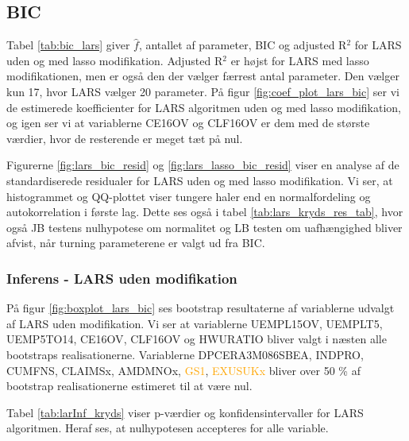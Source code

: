 \subsection{BIC}
Tabel \ref{tab:bic_lars} giver $\widehat{f}$, antallet af parameter, BIC og adjusted R$^2$ for LARS uden og med lasso modifikation. 
Adjusted R$^2$ er højst for LARS med lasso modifikationen, men er også den der vælger færrest antal parameter. 
Den vælger kun 17, hvor LARS vælger 20 parameter. 
På figur \ref{fig:coef_plot_lars_bic} ser vi de estimerede koefficienter for LARS algoritmen uden og med lasso modifikation, og igen ser  vi at variablerne \textcolor{blue3}{CE16OV} og \textcolor{blue3}{CLF16OV} er dem med de største værdier, hvor de resterende er meget tæt på nul. 




Figurerne \ref{fig:lars_bic_resid} og  \ref{fig:lars_lasso_bic_resid} viser en analyse af de standardiserede residualer for LARS uden og med lasso modifikation. Vi ser, at histogrammet og QQ-plottet viser tungere haler end en normalfordeling og autokorrelation i første lag. Dette ses også i tabel \ref{tab:lars_kryds_res_tab}, hvor også JB testens nulhypotese om normalitet og LB testen om uafhængighed bliver afvist, når turning parameterene er valgt ud fra BIC. 


\subsubsection{Inferens - LARS uden modifikation}
På figur \ref{fig:boxplot_lars_bic} ses bootstrap resultaterne af variablerne udvalgt af LARS uden modifikation. Vi ser at variablerne  \textcolor{blue3}{UEMPL15OV}, \textcolor{blue3}{UEMPLT5}, \textcolor{blue3}{UEMP5TO14}, \textcolor{blue3}{CE16OV}, \textcolor{blue3}{CLF16OV} og \textcolor{blue3}{HWURATIO} bliver valgt i næsten alle bootstraps realisationerne.
 Variablerne \textcolor{red3}{DPCERA3M086SBEA},  \textcolor{chartreuse4}{INDPRO}, \textcolor{chartreuse4}{CUMFNS}, \textcolor{blue3}{CLAIMSx}, \textcolor{red3}{AMDMNOx}, \textcolor{orange}{GS1}, \textcolor{orange}{EXUSUKx}  bliver over 50 \% af bootstrap realisationerne estimeret til at være nul.  

Tabel \ref{tab:larInf_kryds} viser p-værdier og konfidensintervaller for LARS algoritmen. Heraf ses, at nulhypotesen accepteres for alle variable.

